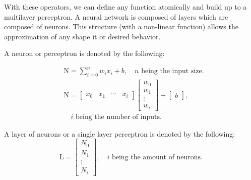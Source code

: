 With these operators, we can define any function atomically and build up to
a multilayer perceptron. A neural network is composed of layers which are composed of neurons. 
This structure (with a non-linear function) allows the approximation of any shape it or desired behavior. 

\begin{definition}[Neuron]
    A neuron or perceptron is denoted by the following:

    \begin{align*}
        & \text{N} = \sum_{i=0}^{n} w_i x_i + b , \quad n \text{ being the input size.} \\
        & \text{N} = 
         \begin{bmatrix}
            x_0 & x_1 & \cdots & x_i 
        \end{bmatrix}
        \begin{bmatrix}
            w_0 \\
            w_1 \\
            \vdots \\
            w_i
        \end{bmatrix}
            +
        \begin{bmatrix}
            b
        \end{bmatrix}, \\ 
        & \quad i \text{ being the number of inputs.}
    \end{align*}
\end{definition}

\begin{definition}[Layer]
    A layer of neurons or a single layer perceptron is denoted by the following:
    \begin{equation}
        \text{L} = 
        \begin{bmatrix}
        N_0 \\
        N_1 \\
        \vdots \\
        N_i    
        \end{bmatrix}, \quad i \text{ being the amount of neurons.}
    \end{equation}
\end{definition}

